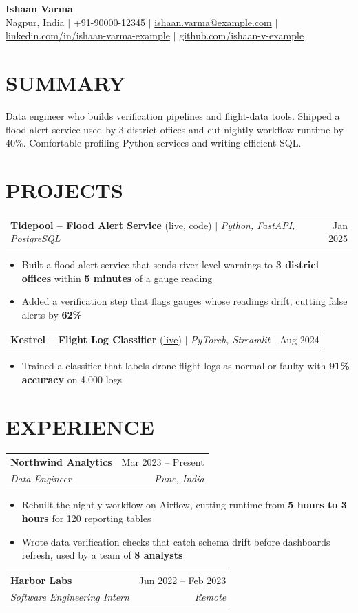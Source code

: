 \documentclass[letterpaper,10pt]{article}
\makeatletter
\newcommand{\entry}[4]{%
  \begin{tabularx}{\textwidth}{@{}X r@{}}
    \textbf{#1} & #2 \\
    \textit{#3} & \textit{#4} \\
  \end{tabularx}\vspace{-4pt}}
\newcommand{\oneline}[2]{%
  \begin{tabularx}{\textwidth}{@{}X r@{}}
    #1 & #2 \\
  \end{tabularx}\vspace{-4pt}}
\makeatother
\begin{document}
\begin{center}
  {\LARGE\bfseries Ishaan Varma}\\[2pt]
  Nagpur, India $|$ +91-90000-12345 $|$
  \href{mailto:ishaan.varma@example.com}{ishaan.varma@example.com} $|$
  \href{https://linkedin.com/in/ishaan-varma-example}{linkedin.com/in/ishaan-varma-example} $|$
  \href{https://github.com/ishaan-v-example}{github.com/ishaan-v-example}
\end{center}

\section*{SUMMARY}
Data engineer who builds verification pipelines and flight-data tools. Shipped a
flood alert service used by 3 district offices and cut nightly workflow runtime by
40\%. Comfortable profiling Python services and writing efficient SQL.

\section*{PROJECTS}
\oneline{\textbf{Tidepool -- Flood Alert Service} (\href{https://tidepool.example.com}{live},
  \href{https://github.com/ishaan-v-example/tidepool}{code}) $|$ \textit{Python, FastAPI, PostgreSQL}}{Jan 2025}
\begin{itemize}
  \item Built a flood alert service that sends river-level warnings to \textbf{3 district offices} within \textbf{5 minutes} of a gauge reading
  \item Added a verification step that flags gauges whose readings drift, cutting false alerts by \textbf{62\%}
\end{itemize}
\oneline{\textbf{Kestrel -- Flight Log Classifier} (\href{https://kestrel.example.org}{live}) $|$ \textit{PyTorch, Streamlit}}{Aug 2024}
\begin{itemize}
  \item Trained a classifier that labels drone flight logs as normal or faulty with \textbf{91\% accuracy} on 4,000 logs
\end{itemize}

\section*{EXPERIENCE}
\entry{Northwind Analytics}{Mar 2023 -- Present}{Data Engineer}{Pune, India}
\begin{itemize}
  \item Rebuilt the nightly workflow on Airflow, cutting runtime from \textbf{5 hours to 3 hours} for 120 reporting tables
  \item Wrote data verification checks that catch schema drift before dashboards refresh, used by a team of \textbf{8 analysts}
\end{itemize}
\entry{Harbor Labs}{Jun 2022 -- Feb 2023}{Software Engineering Intern}{Remote}
\end{document}
